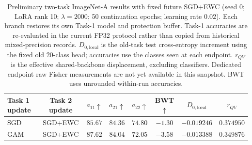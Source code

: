 \begin{table}[t]
\centering
\captionsetup{font=footnotesize,labelfont=bf}
\caption{Preliminary two-task ImageNet-A results with fixed future SGD+EWC
(seed 0; LoRA rank 10; $\lambda=2000$; 50 continuation epochs; learning rate
$0.02$). Each branch restores its own Task-1 model and protection buffer.
Task-1 accuracies are re-evaluated in the current FP32 protocol rather than
copied from historical mixed-precision records.
$D_{0,\mathrm{local}}$ is the old-task test cross-entropy increment using
the fixed old 20-class head; accuracies use the classes seen at each endpoint.
$r_{QV}$ is the effective shared-backbone displacement, excluding classifiers.
Dedicated endpoint raw Fisher measurements are not yet available in this
snapshot. BWT uses unrounded within-run accuracies.}
\label{tab:two_task_imageneta_fixed_future_preliminary}
\scriptsize
\setlength{\tabcolsep}{3pt}
\begin{tabular*}{\textwidth}{@{\extracolsep{\fill}}lccccccc@{}}
\toprule
Task 1 update & Task 2 update
& $a_{11}\uparrow$ & $a_{21}\uparrow$ & $a_{22}\uparrow$
& BWT$\uparrow$ & $D_{0,\mathrm{local}}$ & $r_{QV}$ \\
\midrule
SGD & SGD+EWC & $85.67$ & $84.36$ & $74.80$ & $-1.30$ & $-0.019246$ & $0.374950$ \\
GAM & SGD+EWC & $87.62$ & $84.04$ & $72.05$ & $-3.58$ & $-0.013388$ & $0.349876$ \\
\bottomrule
\end{tabular*}
\end{table}
